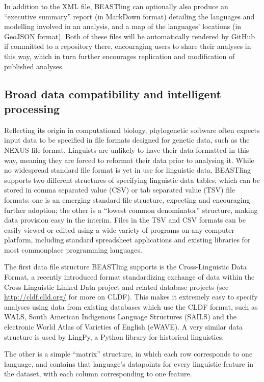 \documentclass[10pt,a4paper]{article}
\begin{document}
In addition to the XML file, BEASTling can optionally also produce an ``executive summary'' report (in MarkDown format) detailing the languages and modelling involved in an analysis, and a map of the languages' locations (in GeoJSON format).  Both of these files will be automatically rendered by GitHub if committed to a repository there, encouraging users to share their analyses in this way, which in turn further encourages replication and modification of published analyses.

\subsection{Broad data compatibility and intelligent processing}

Reflecting its origin in computational biology, phylogenetic software often expects input data to be specified in file formats designed for genetic data, such as the NEXUS file format\cite{Maddison1997}.  Linguists are unlikely to have their data formatted in this way, meaning they are forced to reformat their data prior to analysing it. While no widespread standard file format is yet in use for linguistic data, BEASTling supports two different structures of specifying linguistic data tables, which can be stored in comma separated value (CSV) or tab separated value (TSV) file formats: one is an emerging standard file structure, expecting and encouraging further adoption; the other is a ``lowest common denominator'' structure, making data provision easy in the interim. Files in the TSV and CSV formats can be easily viewed or edited using a wide variety of programs on any computer platform, including standard spreadsheet applications and existing libraries for most commonplace programming languages.

The first data file structure BEASTling supports is the Cross-Linguistic Data Format\cite{Forkel2016}, a recently introduced format standardizing exchange of data within the Cross-Linguistic Linked Data project and related database projects (see \url{http://cldf.clld.org/} for more on CLDF).  This makes it extremely easy to specify analyses using data from existing databases which use the CLDF format, such as WALS, South American Indigenous Language Structures\cite{Muysken2014} (SAILS) and the electronic World Atlas of Varieties of English\cite{Kortmann2013} (eWAVE). A very similar data structure is used by LingPy\cite{List2016}, a Python library for historical linguistics.

The other is a simple ``matrix'' structure, in which each row corresponds to one language, and contains that language's datapoints for every linguistic feature in the dataset, with each column corresponding to one feature.
\end{document}
